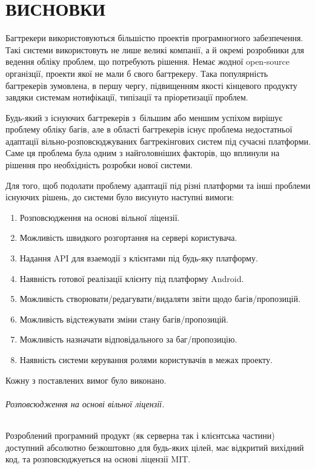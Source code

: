 \documentclass[../main.tex]{subfiles}
\begin{document}
\chapter*{ВИСНОВКИ}

Багтрекери використовуються більшістю проектів програмногного забезпечення. Такі системи використовуть не лише великі компанії, а й окремі розробники для ведення обліку проблем, що потребують рішення. Немає жодної open-source організції, проекти якої не мали б свого багтрекеру. Така популярність багтрекерів зумовлена, в першу чергу, підвищенням якості кінцевого продукту завдяки системам нотифікації, типізації та пріоретизації проблем.

Будь-який з існуючих багтрекерів з~більшим або меншим успіхом вирішує проблему обліку багів, але в області багтрекерів існує проблема недостатньої адаптації вільно-розповсюджуваних багтрекінгових систем під сучасні платформи. Саме ця проблема була одним з найголовніших факторів, що вплинули на рішення про необхідність розробки нової системи.

Для того, щоб подолати проблему адаптації під різні платформи та інші проблеми існуючих рішень, до системи було висунуто наступні вимоги:

\begin{enumerate}
	\item Розповсюдження на основі вільної ліцензії.
	\item Можливість швидкого розгортання на сервері користувача.
	\item Надання API для взаемодії з клієнтами під будь-яку платформу.
	\item Наявність готової реалізації клієнту під платформу Android.
	\item Можливість створювати/редагувати/видаляти звіти щодо багів/пропозицій.
	\item Можливість відстежувати зміни стану багів/пропозицій.
	\item Можливість назначати відповідального за баг/пропозицію.
	\item Наявність системи керування ролями користувачів в межах проекту.
\end{enumerate}

Кожну з поставлених вимог було виконано.

\subparagraph{Розповсюдження на основі вільної ліцензії.}
Розроблений програмний продукт (як серверна так і клієнтська частини) доступний абсолютно безкоштовно для будь-яких цілей, має відкритий вихідний код, та розповсюджуеться на основі ліцензії MIT.
\end{document}
